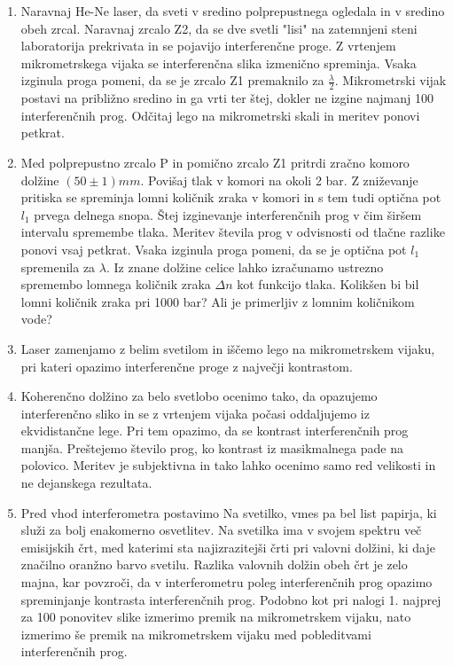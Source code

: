\documentclass[12pt]{report}
\begin{document}
\begin{enumerate}
  \item Naravnaj He-Ne laser, da sveti v sredino polprepustnega ogledala in v sredino obeh zrcal. Naravnaj zrcalo Z2, da se dve svetli "lisi" na zatemnjeni steni laboratorija prekrivata in se pojavijo interferenčne proge. Z vrtenjem mikrometrskega vijaka se interferenčna slika izmenično spreminja.  Vsaka izginula proga pomeni, da se je zrcalo Z1 premaknilo za $\frac{\lambda}{2}$. Mikrometrski vijak postavi na približno sredino in ga vrti ter štej, dokler ne izgine najmanj 100 interferenčnih prog. Odčitaj lego na mikrometrski skali in meritev ponovi petkrat. 
  \item Med polprepustno zrcalo P in pomično zrcalo Z1 pritrdi zračno komoro dolžine $(50 \pm 1)mm$. Povišaj tlak v komori na okoli 2 bar. Z zniževanje pritiska se spreminja lomni količnik zraka v komori in s tem tudi optična pot $l_1$ prvega delnega snopa. Štej izginevanje interferenčnih prog v čim širšem intervalu spremembe tlaka. Meritev števila prog v odvisnosti od tlačne razlike ponovi vsaj petkrat. Vsaka izginula proga pomeni, da se je optična pot $l_1$ spremenila za $\lambda$. Iz znane dolžine celice lahko izračunamo ustrezno spremembo lomnega količnik zraka $\Delta n$ kot funkcijo tlaka. Kolikšen bi bil lomni količnik zraka pri 1000 bar? Ali je primerljiv z lomnim količnikom vode?
  \item Laser zamenjamo z belim svetilom in iščemo lego na mikrometrskem vijaku, pri kateri opazimo interferenčne proge z največji kontrastom. 
  \item Koherenčno dolžino za belo svetlobo ocenimo tako, da opazujemo interferenčno sliko in se z vrtenjem vijaka počasi oddaljujemo iz ekvidistančne lege. Pri tem opazimo, da se kontrast interferenčnih prog manjša. Preštejemo število prog, ko kontrast iz masikmalnega pade na polovico. Meritev je subjektivna in tako lahko ocenimo samo red velikosti in ne dejanskega rezultata. 
  \item Pred vhod interferometra postavimo Na svetilko, vmes pa bel list papirja, ki služi za bolj enakomerno osvetlitev. Na svetilka ima v svojem spektru več emisijskih črt, med katerimi sta najizrazitejši črti pri valovni dolžini, ki daje značilno oranžno barvo svetilu. Razlika valovnih dolžin obeh črt je zelo majna, kar povzroči, da v interferometru poleg interferenčnih prog opazimo spreminjanje kontrasta interferenčnih prog. Podobno kot pri nalogi 1. najprej za 100 ponovitev slike izmerimo premik na mikrometrskem vijaku, nato izmerimo še premik na mikrometrskem vijaku med pobleditvami interferenčnih prog. 
\end{enumerate}
\end{document}
